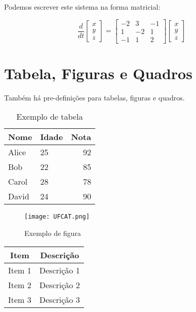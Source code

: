 \documentclass[
	article,			%
	11pt,				%
	oneside,			%
	a4paper,			%
	chapter=TITLE,
	english,			%
	brazil,				%
	sumario=tradicional
	]{templateimtec}
\begin{document}
Podemos escrever este sistema na forma matricial:

\begin{equation*}
\frac{d}{dt}
\begin{bmatrix}
x \\
y \\
z
\end{bmatrix}
=
\begin{bmatrix}
-2 & 3 & -1 \\
1 & -2 & 1 \\
-1 & 1 & 2
\end{bmatrix}
\begin{bmatrix}
x \\
y \\
z
\end{bmatrix}
\end{equation*}
   

\section{Tabela, Figuras e Quadros}

Também há pre-definições para tabelas, figuras e quadros.

\begin{table}[ht]
	\centering
	\caption{Exemplo de tabela}
	\begin{tabular}{llr}
		\toprule
		\textbf{Nome} & \textbf{Idade} & \textbf{Nota} \\
		\midrule
		Alice         & 25             & 92            \\
		Bob           & 22             & 85            \\
		Carol         & 28             & 78            \\
		David         & 24             & 90            \\
		\bottomrule
	\end{tabular}
\end{table}

\begin{figure}[ht]
	\caption{Exemplo de figura}
	\centering
	\texttt{[image: UFCAT.png]} %
	
\end{figure}

\begin{quadro}
	\caption{Exemplo de Quadro}
	\centering
	\begin{tabular}{|c|c|}
		\hline
		Item   & Descrição   \\
		\hline
		Item 1 & Descrição 1 \\
		Item 2 & Descrição 2 \\
		Item 3 & Descrição 3 \\
		\hline
	\end{tabular}
\end{quadro}
\end{document}
